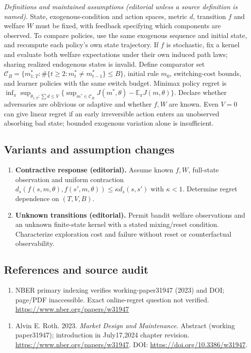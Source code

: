 \documentclass[11pt,a4paper]{article}
\begin{document}
\emph{Definitions and maintained assumptions (editorial unless a source definition is named).} State, exogenous-condition and action spaces, metric \(d\), transition \(f\) and welfare \(W\) must be fixed, with feedback specifying which components are observed. To compare policies, use the same exogenous sequence and initial state, and recompute each policy’s own state trajectory. If \(f\) is stochastic, fix a kernel and evaluate both welfare expectations under their own induced path laws; sharing realized endogenous states is invalid. Define comparator set \(\mathcal C_B=\{m^*_{1:T}:\#\{t\ge2:m_t^*\ne m_{t-1}^*\}\le B\}\), initial rule \(m_0\), switching-cost bounds, and learner policies with the same switch budget. Minimax policy regret is \(\inf_\pi\sup_{\theta_{1:T}:\sum d\le V}\{\sup_{m^*\in\mathcal C_B}J(m^*,\theta)-\mathbb E_\pi J(m,\theta)\}\). Declare whether adversaries are oblivious or adaptive and whether \(f,W\) are known. Even \(V=0\) can give linear regret if an early irreversible action enters an unobserved absorbing bad state; bounded exogenous variation alone is insufficient.
\subsection*{Variants and assumption changes}
\begin{enumerate}
\item \textbf{Contractive response (editorial).} Assume known \(f,W\), full-state observation and uniform contraction \(d_s(f(s,m,\theta),f(s',m,\theta))\le\kappa d_s(s,s')\) with \(\kappa<1\). Determine regret dependence on \((T,V,B)\).
\item \textbf{Unknown transitions (editorial).} Permit bandit welfare observations and an unknown finite-state kernel with a stated mixing/reset condition. Characterize exploration cost and failure without reset or counterfactual observability.
\end{enumerate}
\subsection*{References and source audit}
\begin{enumerate}
\item NBER primary indexing verifies working-paper31947 (2023) and DOI; page/PDF inaccessible. Exact online-regret question not verified. \url{https://www.nber.org/papers/w31947}
\end{enumerate}
\begin{enumerate}\raggedright
\item\hypertarget{definitions:source:30007581:1}{} Alvin E. Roth. 2023. \emph{Market Design and Maintenance}. Abstract (working paper31947); introduction in July17,2024 chapter revision.
\url{https://www.nber.org/papers/w31947}.
DOI: \url{https://doi.org/10.3386/w31947}.
\end{enumerate}
\end{document}
